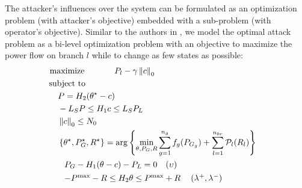 \documentclass[twocolumn,english,final,journal]{IEEEtran}
\theoremstyle{plain}
\theoremstyle{definition}
\begin{document}
The attacker's influences over the system can be formulated as an
optimization problem (with attacker's objective) embedded with a sub-problem
(with operator\textquoteright{}s objective). Similar to the authors
in , we model the optimal attack problem
as a bi-level optimization problem with an objective to maximize the
power flow on branch $l$ while to change as few states as possible:
\begin{align}
\negthickspace\negthickspace\negthickspace\mbox{maximize}\:\: & \qquad\:\:\:\:\: P_{l}-\mbox{\ensuremath{\gamma\left\Vert c\right\Vert _{0}}}\label{eq:Obj}\\
\mbox{\negthickspace\negthickspace\negthickspace subject to }\nonumber \\
 & \negthickspace\negthickspace\negthickspace\negthickspace\negthickspace\negthickspace\negthickspace\negthickspace\negthickspace\negthickspace\negthickspace\negthickspace\negthickspace P=H_{2}(\theta^{\star}-c)\label{eq:PF_EQ}\\
 & \negthickspace\negthickspace\negthickspace\negthickspace\negthickspace\negthickspace\negthickspace\negthickspace\negthickspace\negthickspace\negthickspace\negthickspace\negthickspace-L_{S}P\leq H_{1}c\leq L_{S}P_{L}\label{eq:LS_Constra_1}\\
 & \negthickspace\negthickspace\negthickspace\negthickspace\negthickspace\negthickspace\negthickspace\negthickspace\negthickspace\negthickspace\negthickspace\negthickspace\negthickspace\left\Vert c\right\Vert _{0}\leq N_{0}\label{eq:L0Norm_Constr_1}\\
 & \negthickspace\negthickspace\negthickspace\negthickspace\negthickspace\negthickspace\negthickspace\negthickspace\negthickspace\negthickspace\negthickspace\negthickspace\negthickspace\left\{ \mathbf{\theta^{\star}},P_{G}^{\star},R^{\star}\right\} =\arg\left\{ \min_{\theta,P_{G},R}{\displaystyle \sum_{g=1}^{n_{g}}f_{g}(P_{G_{g}})}+\sum_{l=1}^{n_{br}}\mathcal{P}_{l}(R_{l})\right\} \label{eq:DCOPF1}\\
 & \begin{array}{cc}
\negthickspace\negthickspace\negthickspace\negthickspace\negthickspace\negthickspace\negthickspace\negthickspace\negthickspace\negthickspace\negthickspace\negthickspace{P_{G}-H_{1}(\theta-c)-P_{L}=0} & {(\mathbf{\upsilon})}\end{array}\label{eq:DCOPF2}\\
 & \begin{array}{cc}
\negthickspace\negthickspace\negthickspace\negthickspace\negthickspace\negthickspace\negthickspace\negthickspace\negthickspace\negthickspace\negthickspace\negthickspace{-P^{\max}-R\leq H_{2}\mathbf{\theta}\leq P^{\ensuremath{\max}}+R\:} & {(\lambda^{+},\lambda^{-})}\end{array}\label{eq:DCOPF3}\\

\end{align}
\end{document}
